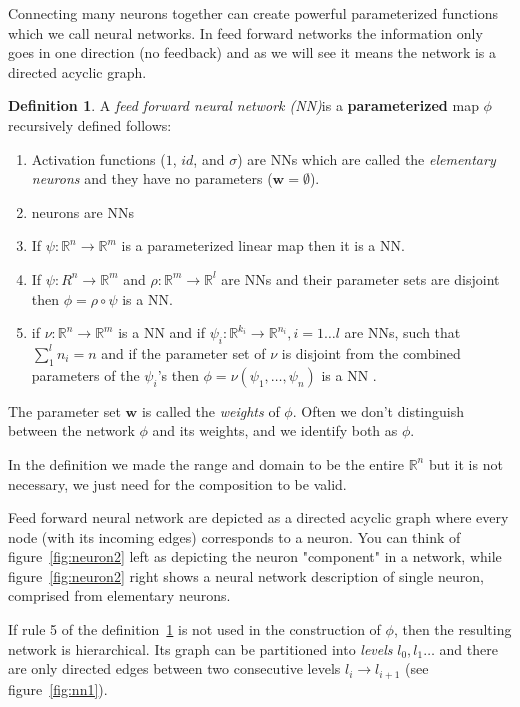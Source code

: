 \documentclass[11pt, a4paper]{report}
\theoremstyle{plain}
\theoremstyle{definition}
\newtheorem{mydef}{Definition}[chapter]
\theoremstyle{remark}
\newcommand{\R}{\mathbb{R}}
\newcommand{\w}{\mathbf{w}}
\begin{document}
Connecting many neurons together can create powerful parameterized
functions which we call neural networks.
In feed forward networks the information only goes in one direction (no
feedback) and as we will see it means the network is a directed acyclic graph.

\begin{mydef}
\label{def:NN}
A \emph{feed forward neural network (NN)}is a \textbf{parameterized} map $\phi$
recursively defined
follows:
\begin{enumerate}
\item{} 
Activation functions ($1$, $id$, and $\sigma$) are NNs which are called the
\emph{elementary neurons} and they have no parameters ($\w=\emptyset$).
\item{} neurons are NNs
\item{} If $\psi :\R^n \to \R^m$ is a parameterized linear map then it is a NN.
\item{} If $\psi : R^n \to \R^m$
and $\rho: \R^m \to \R^l$ are NNs and their parameter sets are disjoint then $\phi = \rho
\circ \psi$ is a NN.
\item{} if $\nu:\R^n \to \R^m$ is a NN
and if $\psi_i: \R^{k_i} \to \R^{n_i}, i =1 \dots l$ are NNs, such that
$\sum_1^l n_i = n$
and if the parameter set of $\nu$ is disjoint from the combined parameters of
the $\psi_i$'s then
$\phi = \nu(\psi_1, \dots, \psi_n)$ is a NN
.
\end{enumerate}

The parameter set $\w$ is called the \emph{weights} of $\phi$. Often we don't
distinguish between the network $\phi$ and its weights, and we identify both as
$\phi$.

In the definition we made the range and domain to be the entire $\R^n$ but it is
not necessary, we just need for the composition to be valid.
\end{mydef}

Feed forward neural network are depicted as a directed acyclic graph where every
node (with its incoming edges) corresponds to a neuron. You can think of
figure~\ref{fig:neuron2} left as depicting the neuron "component" in a network,
while figure~\ref{fig:neuron2} right shows a neural network description of
single neuron, comprised from elementary neurons.

If rule 5 of the definition~\ref{def:NN} is not used in the construction of
$\phi$, then the resulting network is hierarchical. Its graph can be partitioned
into \emph{levels} $l_0, l_1\dots$ and there are only directed edges between two
consecutive levels $l_i \to l_{i+1}$ (see figure~\ref{fig:nn1}).
\end{document}
